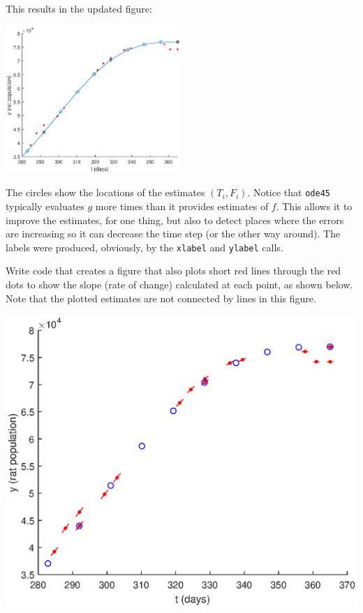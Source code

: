 \documentclass[
]{book}
\begin{document}
This results in the updated figure:  

\beforefig \centerline{\includegraphics[height=2.2in]{figs/ode45plotLabel.eps}}

The circles show the locations of the estimates
$(T_i, F_i)$.  Notice that {\tt ode45} typically evaluates
$g$ 
more times than it provides estimates of $f$.  This allows it to improve the
estimates, for one thing, but also to detect places where the errors
are increasing so it can decrease the time step (or the other
way around).  The labels were produced, obviously, by the {\tt xlabel} and {\tt ylabel} calls.

\begin{ex}
Write code that creates a figure that also plots short 
red lines through the red dots to show the slope (rate of change) calculated
at each point, as shown below.  Note that the plotted estimates are not connected by lines in this figure.


\beforefig \centerline{\includegraphics[width=6.0in]{figs/ode45.eps}}
\end{ex}
\end{document}
